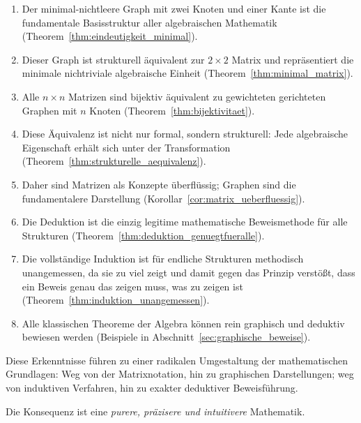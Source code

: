 \documentclass[12pt, a4paper]{article}
\theoremstyle{definition}
\theoremstyle{remark}
\begin{document}
\begin{enumerate}[label=(\roman*)]
  \item Der minimal-nichtleere Graph mit zwei Knoten und einer Kante ist die fundamentale Basisstruktur aller algebraischen Mathematik (Theorem~\ref{thm:eindeutigkeit_minimal}).
  
  \item Dieser Graph ist strukturell äquivalent zur $2 \times 2$ Matrix und repräsentiert die minimale nichtriviale algebraische Einheit (Theorem~\ref{thm:minimal_matrix}).
  
  \item Alle $n \times n$ Matrizen sind bijektiv äquivalent zu gewichteten gerichteten Graphen mit $n$ Knoten (Theorem~\ref{thm:bijektivitaet}).
  
  \item Diese Äquivalenz ist nicht nur formal, sondern strukturell: Jede algebraische Eigenschaft erhält sich unter der Transformation (Theorem~\ref{thm:strukturelle_aequivalenz}).
  
  \item Daher sind Matrizen als Konzepte überflüssig; Graphen sind die fundamentalere Darstellung (Korollar~\ref{cor:matrix_ueberfluessig}).
  
  \item Die Deduktion ist die einzig legitime mathematische Beweismethode für alle Strukturen (Theorem~\ref{thm:deduktion_genuegtfueralle}).
  
  \item Die vollständige Induktion ist für endliche Strukturen methodisch unangemessen, da sie zu viel zeigt und damit gegen das Prinzip verstößt, dass ein Beweis genau das zeigen muss, was zu zeigen ist (Theorem~\ref{thm:induktion_unangemessen}).
  
  \item Alle klassischen Theoreme der Algebra können rein graphisch und deduktiv bewiesen werden (Beispiele in Abschnitt~\ref{sec:graphische_beweise}).
\end{enumerate}

Diese Erkenntnisse führen zu einer radikalen Umgestaltung der mathematischen Grundlagen: Weg von der Matrixnotation, hin zu graphischen Darstellungen; weg von induktiven Verfahren, hin zu exakter deduktiver Beweisführung.

Die Konsequenz ist eine \emph{purere, präzisere und intuitivere} Mathematik.
\end{document}
